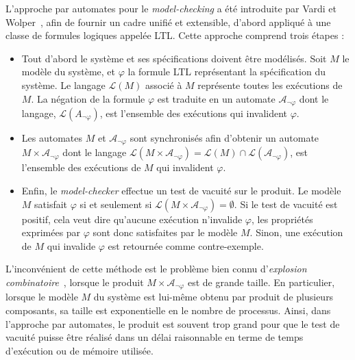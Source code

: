 L'approche par automates pour le \emph{model-checking} a été
introduite par Vardi et Wolper~\cite{vardi_automata-theoretic_1986},
afin de fournir un cadre unifié et extensible, d'abord appliqué à une
classe de formules logiques appelée \textsf{LTL}.  Cette approche
comprend trois étapes :
\begin{itemize}
\item Tout d'abord le système et ses spécifications doivent être
  modélisés. Soit $M$ le modèle du système, et $\varphi$ la formule
  \textsf{LTL} représentant la spécification du système.  Le langage
  $\mathcal{L} (M)$ associé à $M$ représente toutes les exécutions de
  $M$.  La négation de la formule $\varphi$ est traduite en un
  automate $\mathcal{A}_{\neg \varphi}$ dont le langage,
  $\mathcal{L}(A_{\neg \varphi})$, est l'ensemble des exécutions qui
  invalident $\varphi$.
\item Les automates $M$ et $\mathcal{A}_{\neg \varphi}$ sont
  synchronisés afin d'obtenir un automate $M \times \mathcal{A}_{\neg
    \varphi}$ dont le langage $\mathcal{L}(M \times \mathcal{A}_{\neg
    \varphi}) = \mathcal{L} (M) \cap \mathcal{L} (\mathcal{A}_{\neg
    \varphi})$, est l'ensemble des exécutions de $M$ qui invalident
  $\varphi$.
\item Enfin, le \emph{model-checker} effectue un test de vacuité
  sur le produit. Le modèle $M$ satisfait $\varphi$ si et seulement si
  $\mathcal{L} ( M \times \mathcal{A}_{\neg \varphi}) = \emptyset$.
  Si le test de vacuité est positif, cela veut dire qu'aucune
  exécution n'invalide $\varphi$, les propriétés exprimées par
  $\varphi$ sont donc satisfaites par le modèle $M$. Sinon, une
  exécution de $M$ qui invalide $\varphi$ est retournée comme
  contre-exemple.
\end{itemize}		

L'inconvénient de cette méthode est le problème bien connu
d'\emph{explosion combinatoire}~\cite{Valmari96}, lorsque le produit
$M \times \mathcal{A}_{\neg \varphi}$ est de grande taille.  En
particulier, lorsque le modèle $M$ du système est lui-même obtenu par
produit de plusieurs composants, sa taille est exponentielle en le
nombre de processus. Ainsi, dans l'approche par automates, le produit
est souvent trop grand pour que le test de vacuité puisse être réalisé
dans un délai raisonnable en terme de temps d'exécution ou de mémoire
utilisée.

